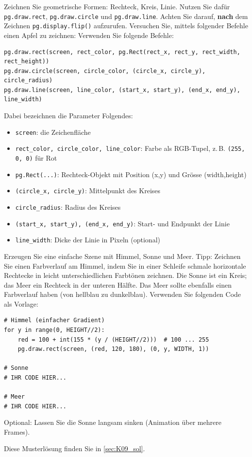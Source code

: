 \begin{myexercise}
    Zeichnen Sie geometrische Formen: Rechteck, Kreis, Linie. Nutzen Sie dafür \lstinline|pg.draw.rect|, \lstinline|pg.draw.circle| und \lstinline|pg.draw.line|. Achten Sie darauf, \textbf{nach} dem Zeichnen \lstinline|pg.display.flip()| aufzurufen. Versuchen Sie, mittels folgender Befehle einen Apfel zu zeichnen:
    Verwenden Sie folgende Befehle:
    \begin{lstlisting}
pg.draw.rect(screen, rect_color, pg.Rect(rect_x, rect_y, rect_width, rect_height))
pg.draw.circle(screen, circle_color, (circle_x, circle_y), circle_radius)
pg.draw.line(screen, line_color, (start_x, start_y), (end_x, end_y), line_width)
\end{lstlisting}

    Dabei bezeichnen die Parameter Folgendes:
    \begin{itemize}
        \item \lstinline|screen|: die Zeichenfläche
        \item \lstinline|rect_color, circle_color, line_color|: Farbe als RGB-Tupel, z.\,B. \lstinline|(255, 0, 0)| für Rot
        \item \lstinline|pg.Rect(...)|: Rechteck-Objekt mit Position (x,y) und Grösse (width,height)
        \item \lstinline|(circle_x, circle_y)|: Mittelpunkt des Kreises
        \item \lstinline|circle_radius|: Radius des Kreises
        \item \lstinline|(start_x, start_y), (end_x, end_y)|: Start- und Endpunkt der Linie
        \item \lstinline|line_width|: Dicke der Linie in Pixeln (optional)
    \end{itemize}
\end{myexercise}

\begin{myexercise}\label{myexercise:Sonnenuntergang}
    Erzeugen Sie eine einfache Szene mit Himmel, Sonne und Meer. Tipp: Zeichnen Sie einen Farbverlauf am Himmel, indem Sie in einer Schleife schmale horizontale Rechtecke in leicht unterschiedlichen Farbtönen zeichnen. Die Sonne ist ein Kreis; das Meer ein Rechteck in der unteren Hälfte. Das Meer sollte ebenfalls einen Farbverlauf haben (von hellblau zu dunkelblau). Verwenden Sie folgenden Code als Vorlage:
    \begin{lstlisting}
# Himmel (einfacher Gradient)
for y in range(0, HEIGHT//2):
	red = 100 + int(155 * (y / (HEIGHT//2)))  # 100 ... 255
	pg.draw.rect(screen, (red, 120, 180), (0, y, WIDTH, 1))

# Sonne
# IHR CODE HIER...

# Meer
# IHR CODE HIER...
\end{lstlisting}
    Optional: Lassen Sie die Sonne langsam sinken (Animation über mehrere Frames).
	\begin{myanswer}
		Diese Musterlösung finden Sie in \cref{sec:K09_sol}.
	\end{myanswer}
\end{myexercise}

